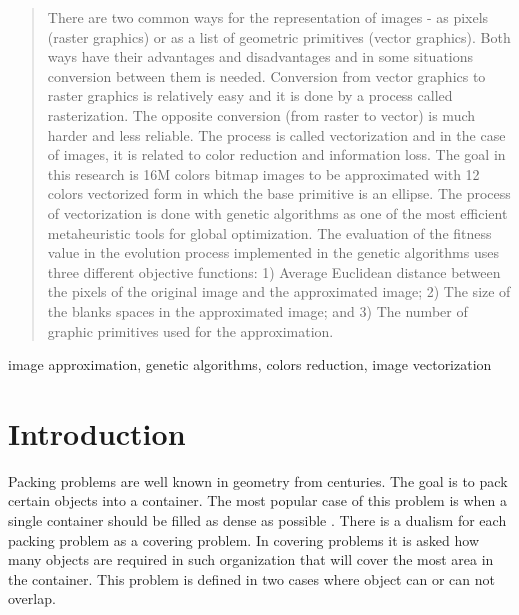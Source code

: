 \documentclass[conference]{IEEEtran}
\begin{document}
\maketitle

\begin{abstract}
There are two common ways for the representation of images - as pixels (raster graphics) or as a list of geometric primitives (vector graphics). Both ways have their advantages and disadvantages and in some situations conversion between them is needed. Conversion from vector graphics to raster graphics is relatively easy and it is done by a process called rasterization. The opposite conversion (from raster to vector) is much harder and less reliable. The process is called vectorization and in the case of images, it is related to color reduction and information loss. The goal in this research is 16M colors bitmap images to be approximated with 12 colors vectorized form in which the base primitive is an ellipse. The process of vectorization is done with genetic algorithms as one of the most efficient metaheuristic tools for global optimization. The evaluation of the fitness value in the evolution process implemented in the genetic algorithms uses three different objective functions: 1) Average Euclidean distance between the pixels of the original image and the approximated image; 2) The size of the blanks spaces in the approximated image; and 3) The number of graphic primitives used for the approximation. 
\end{abstract}

\begin{IEEEkeywords}
image approximation, genetic algorithms, colors reduction, image vectorization
\end{IEEEkeywords}

\section{Introduction}

Packing problems are well known in geometry from centuries. The goal is to pack certain objects into a container. The most popular case of this problem is when a single container should be filled as dense as possible \cite{Lodi-Martello-Monaci-2002}. There is a dualism for each packing problem as a covering problem. In covering problems it is asked how many objects are required in such organization that will cover the most area in the container. This problem is defined in two cases where object can or can not overlap. 
\end{document}

